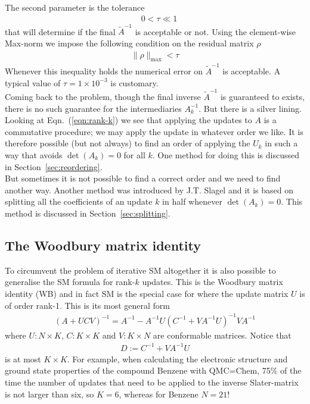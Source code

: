 \documentclass[11pt]{article}
\numberwithin{figure}{section}
\numberwithin{table}{section}
\begin{document}
			The second parameter is the tolerance 
			\begin{align}\label{eqn:tolerance}
				\quad 0 < \tau \ll 1
			\end{align}
			that will determine if the final $\widetilde{A}^{-1}$ is acceptable or not. Using the element-wise Max-norm we impose the following condition on the residual matrix $\rho$
			\begin{align}\label{eqn:acceptance-condition}
				\|\rho\|_\mathrm{max} < \tau
			\end{align}
			Whenever this inequality holds the numerical error on $\widetilde{A}^{-1}$ is acceptable. A typical value of $\tau = 1\times 10^{-3}$ is customary.\\
			
			Coming back to the problem, though the final inverse $\widetilde{A}^{-1}$ is guaranteed to exists, there is no such guarantee for the intermediaries $A_k^{-1}$. But there is a silver lining. Looking at Eqn.~(\ref{eqn:rank-k}) we see that applying the updates to $A$ is a commutative procedure; we may apply the update in whatever order we like. It is therefore possible (but not always) to find an order of applying the $U_k$ in such a way that avoids $\det(A_k)=0$ for all $k$. One method for doing this is discussed in Section~\ref{sec:reordering}.\\
			
			But sometimes it is not possible to find a correct order and we need to find another way. Another method was introduced by J.T. Slagel and it is based on splitting all the coefficients of an update $k$ in half whenever $\det(A_k)=0$. This method is discussed in Section~\ref{sec:splitting}.\\
			
		\subsection{The Woodbury matrix identity}\label{sec:intro-woodbury}
			To circumvent the problem of iterative SM altogether it is also possible to generalise the SM formula for rank-$k$ updates. This is the Woodbury matrix identity (WB) and in fact SM is the special case for where the update matrix $U$ is of order rank-1. This is its most general form
			\begin{align}
				\left(A+UCV\right)^{-1} = A^{-1} - A^{-1}U(C^{-1}+VA^{-1}U)^{-1}VA^{-1}
			\end{align}
			where $U:N\times K$, $C:K\times K$ and $V:K\times N$ are conformable matrices. Notice that
			\begin{align}\label{eqn:wb-denom}
				D:=C^{-1}+VA^{-1}U
			\end{align}  is at most $K\times K$. For example, when calculating the electronic structure and ground state properties of the compound Benzene with QMC=Chem, 75\% of the time the number of updates that need to be applied to the inverse Slater-matrix is not larger than six, so $K=6$, whereas for Benzene $N=21$!\\
			
\end{document}
